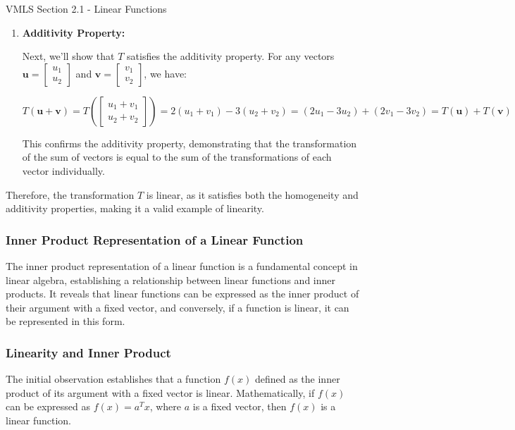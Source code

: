 \begin{notes}{VMLS Section 2.1 - Linear Functions}
\begin{highlight}
\begin{enumerate}
            \item \textbf{Additivity Property:}
            
            Next, we'll show that \(T\) satisfies the additivity property. For any vectors \(\mathbf{u} = \begin{bmatrix} u_1 \\ u_2 \end{bmatrix}\) and \(\mathbf{v} = \begin{bmatrix} v_1 \\ v_2 \end{bmatrix}\), we have:
            
            \[
            T(\mathbf{u} + \mathbf{v}) = T\left(\begin{bmatrix} u_1 + v_1 \\ u_2 + v_2 \end{bmatrix}\right) = 2(u_1 + v_1) - 3(u_2 + v_2) = (2u_1 - 3u_2) + (2v_1 - 3v_2) = T(\mathbf{u}) + T(\mathbf{v})
            \]
            
            This confirms the additivity property, demonstrating that the transformation of the sum of vectors is equal to the sum of the transformations of each vector individually.
        \end{enumerate}
        Therefore, the transformation \(T\) is linear, as it satisfies both the homogeneity and additivity properties, making it a valid example of linearity.
    \end{highlight}

    \subsubsection*{Inner Product Representation of a Linear Function}
    
    The inner product representation of a linear function is a fundamental concept in linear algebra, establishing a relationship between linear functions and inner products. It reveals that linear functions can be expressed 
    as the inner product of their argument with a fixed vector, and conversely, if a function is linear, it can be represented in this form.
    
    \subsubsection*{Linearity and Inner Product}
    
    The initial observation establishes that a function \(f(x)\) defined as the inner product of its argument with a fixed vector is linear. Mathematically, if \(f(x)\) can be expressed as \(f(x) = a^T x\), where \(a\) is a 
    fixed vector, then \(f(x)\) is a linear function.
    

\end{notes}
